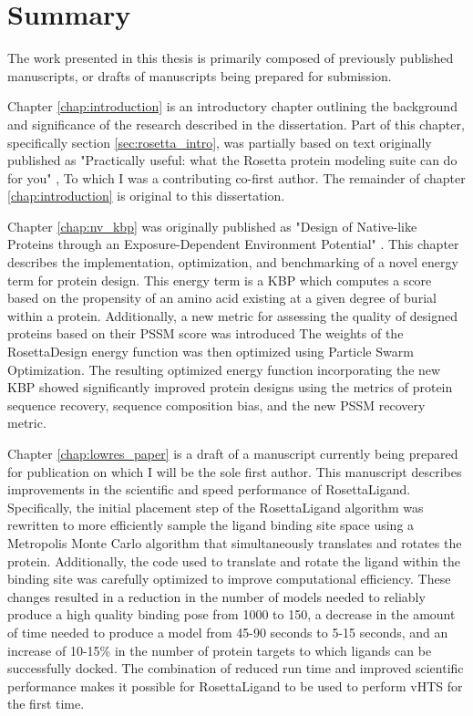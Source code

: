 \chapter*{Summary}
\vspace{7mm}

The work presented in this thesis is primarily composed of previously published manuscripts, or drafts of manuscripts being prepared for submission.

Chapter \ref{chap:introduction} is an introductory chapter outlining the background and significance of the research described in the dissertation.
Part of this chapter, specifically section \ref{sec:rosetta_intro}, was partially based on text originally published as "Practically useful: what the Rosetta protein modeling suite can do for you" \citep{Kaufmann:2010ea}, To which I was a contributing co-first author.
The remainder of chapter \ref{chap:introduction} is original to this dissertation.

Chapter \ref{chap:nv_kbp} was originally published as "Design of Native-like Proteins through an Exposure-Dependent Environment Potential" \citep{DeLuca:2011gg}.
This chapter describes the implementation, optimization, and benchmarking of a novel energy term for protein design.
This energy term is a \ac{KBP} which computes a score based on the propensity of an amino acid existing at a given degree of burial within a protein.
Additionally, a new metric for assessing the quality of designed proteins based on their \ac{PSSM} score was introduced
The weights of the RosettaDesign energy function was then optimized using Particle Swarm Optimization.
The resulting optimized energy function incorporating the new \ac{KBP} showed significantly improved protein designs using the metrics of protein sequence recovery, sequence composition bias, and the new \ac{PSSM} recovery metric.

Chapter \ref{chap:lowres_paper} is a draft of a manuscript currently being prepared for publication on which I will be the sole first author.
This manuscript describes improvements in the scientific and speed performance of RosettaLigand.
Specifically, the initial placement step of the RosettaLigand algorithm was rewritten to more efficiently sample the ligand binding site space using a Metropolis Monte Carlo algorithm that simultaneously translates and rotates the protein.
Additionally, the code used to translate and rotate the ligand within the binding site was carefully optimized to improve computational efficiency.
These changes resulted in a reduction in the number of models needed to reliably produce a high quality binding pose from 1000 to 150, a decrease in the amount of time needed to produce a model from 45-90 seconds to 5-15 seconds, and an increase of 10-15\% in the number of protein targets to which ligands can be successfully docked.
The combination of reduced run time and improved scientific performance makes it possible for RosettaLigand to be used to perform \ac{vHTS} for the first time.

